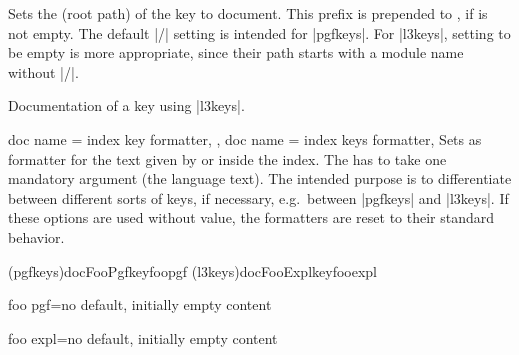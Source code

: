 \clearpage

\begin{docTcbKeys}[
    doc new         = {2023-12-01},
    doc name        = doc key prefix,
    doc parameter   = {=\meta{key prefix}},
    doc description = {no default, initially |/|},
  ]{}
  Sets the  (root path) of the key to document.
  This prefix is prepended to , if
   is not empty.
  The default |/| setting is intended for |pgfkeys|.
  For |l3keys|, setting  to be empty is more
  appropriate, since their path starts with a module name without |/|.
\begin{dispExample}
\begin{docKeys}[
    doc no index,  %
    doc key prefix  = ,
    doc keypath     = tcobox,%
    doc name        = my_l3_key,
    doc parameter   = {=\meta{some value}},
    doc description = example,
  ] {}
  Documentation of a key using |l3keys|.
\end{docKeys}
\end{dispExample}
\end{docTcbKeys}



\begin{docTcbKeys}[
    doc new         = {2023-12-01},
    doc parameter   = \colOpt{=\meta{macro}},
    doc description = {no default, initially empty},
  ]{
    {
      doc name = index key formatter,
    },
    {
      doc name = index keys formatter,
    }
  }
Sets  as formatter for the text given by
 or
 inside the index.
The  has to take one mandatory
argument (the language text).
The intended purpose is to differentiate between different sorts of
keys, if necessary, e.g.\ between |pgfkeys| and |l3keys|.
If these options are used without value, the formatters are reset to
their standard behavior.

\begin{dispExample}
\newcommand{\myFormatPgfkeysIndex}[1]{#1 (\textsf{pgfkeys})}
\newcommand{\myFormatExplkeysIndex}[1]{#1 (\textsf{l3keys})}

\tcbmakedocSubKey[
    index key formatter=\myFormatPgfkeysIndex,
    index keys formatter=\myFormatPgfkeysIndex
  ]{docFooPgfkey}{foopgf}
\tcbmakedocSubKey[
    doc key prefix=,
    index key formatter=\myFormatExplkeysIndex,
    index keys formatter=\myFormatExplkeysIndex
  ]{docFooExplkey}{fooexpl}

\begin{docFooPgfkey}{foo pgf}{=}{no default, initially empty}
  content
\end{docFooPgfkey}

\begin{docFooExplkey}{foo expl}{=}{no default, initially empty}
  content
\end{docFooExplkey}
\end{dispExample}
\end{docTcbKeys}



